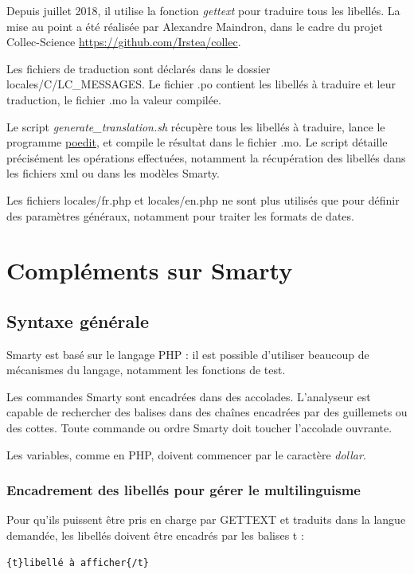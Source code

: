 Depuis juillet 2018, il utilise la fonction \textit{gettext} pour traduire tous les libellés. La mise au point a été réalisée par Alexandre Maindron, dans le cadre du projet Collec-Science \href{https://github.com/Irstea/collec}{https://github.com/Irstea/collec}.

Les fichiers de traduction sont déclarés dans le dossier locales/C/LC\_MESSAGES. Le fichier .po contient les libellés à traduire et leur traduction, le fichier .mo la valeur compilée.

Le script \textit{generate\_translation.sh} récupère tous les libellés à traduire, lance le programme \href{https://poedit.net/}{poedit}, et compile le résultat dans le fichier .mo. Le script détaille précisément les opérations effectuées, notamment la récupération des libellés dans les fichiers xml ou dans les modèles Smarty.

Les fichiers locales/fr.php et locales/en.php ne sont plus utilisés que pour définir des paramètres généraux, notamment pour traiter les formats de dates.

\chapter{Compléments sur Smarty}\label{smarty}

\section{Syntaxe générale}
Smarty est basé sur le langage PHP : il est possible d'utiliser beaucoup de mécanismes du langage, notamment les fonctions de test.

Les commandes Smarty sont encadrées dans des accolades. L'analyseur est capable de rechercher des balises dans des chaînes encadrées par des guillemets ou des cottes. Toute commande ou ordre Smarty doit toucher l'accolade ouvrante.

Les variables, comme en PHP, doivent commencer par le caractère \textit{dollar}.

\subsection{Encadrement des libellés pour gérer le multilinguisme}

Pour qu'ils puissent être pris en charge par GETTEXT et traduits dans la langue demandée, les libellés doivent être encadrés par les balises t :
\begin{lstlisting}
{t}libellé à afficher{/t}
\end{lstlisting}

